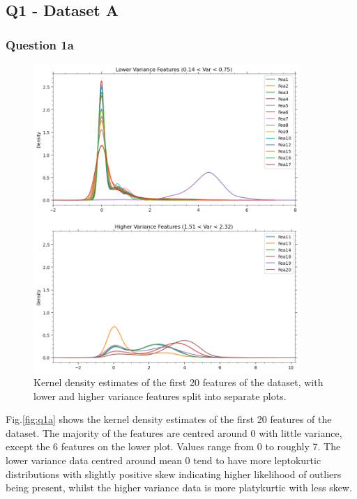 
\subsection{Q1 - Dataset A}\label{subsec:dataset-a}
\subsubsection{Question 1a}\label{subsubsec:q1a}
    \begin{figure}[htb]
    \centering
    \includegraphics[width=0.9\textwidth]{./figures/q1a}
    \caption{Kernel density estimates of the first 20 features of the  dataset, with lower
        and higher variance features split into separate plots.}
    \label{fig:q1a}
    \end{figure}

    Fig.\eqref{fig:q1a} shows the kernel density estimates of the first 20 features of the dataset.
    The majority of the features are centred around 0 with little variance, except the 6 features on the lower plot.
    Values range from 0 to roughly 7.
    The lower variance data centred around mean 0 tend to have more leptokurtic distributions with slightly positive
    skew indicating higher likelihood of outliers being present, whilst the higher variance data is more platykurtic
    with less skew.

